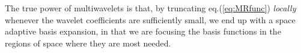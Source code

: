\noindent
The true power of multiwavelets is that, by truncating eq.(\ref{eq:MRfunc})
\emph{locally} whenever the wavelet coefficients are sufficiently small, we
end up with a space adaptive basis expansion, in that we are focusing the
basis functions in the regions of space where they are most needed.



